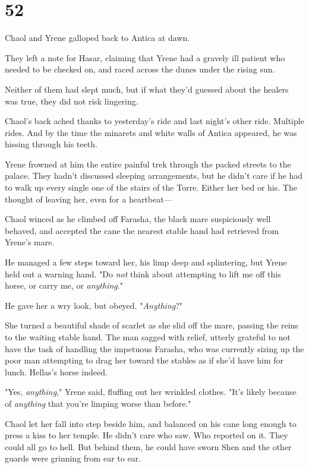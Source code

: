 
\chapter{52}

Chaol and Yrene galloped back to Antica at dawn.

They left a note for Hasar, claiming that Yrene had a gravely ill patient who needed to be checked on, and raced across the dunes under the rising sun.

Neither of them had slept much, but if what they'd guessed about the healers was true, they did not risk lingering.

Chaol's back ached thanks to yesterday's ride and last night's 
other ride. Multiple rides. And by the time the minarets and white walls of Antica appeared, he was hissing through his teeth.

Yrene frowned at him the entire painful trek through the packed streets to the palace. They hadn't discussed sleeping arrangements, but he didn't care if he had to walk up every single one of the stairs of the Torre. Either her bed or his. The thought of leaving her, even for a heartbeat---

Chaol winced as he climbed off Farasha, the black mare suspiciously well behaved, and accepted the cane the nearest stable hand had retrieved from Yrene's mare.

He managed a few steps toward her, his limp deep and splintering, but Yrene held out a warning hand. "Do \emph{not} think about attempting to lift me off this horse, or carry me, or \emph{anything}."

He gave her a wry look, but obeyed. "\emph{Anything}?"

She turned a beautiful shade of scarlet as she slid off the mare, passing the reins to the waiting stable hand. The man sagged with relief, utterly grateful to not have the task of handling the impetuous Farasha, who was currently sizing up the poor man attempting to drag her toward the stables as if she'd have him for lunch. Hellas's horse indeed.

"Yes, \emph{anything}," Yrene said, fluffing out her wrinkled clothes. "It's likely because of \emph{anything} that you're limping worse than before."

Chaol let her fall into step beside him, and balanced on his cane long enough to press a kiss to her temple. He didn't care who saw. Who reported on it. They could all go to hell. But behind them, he could have sworn Shen and the other guards were grinning from ear to ear.

